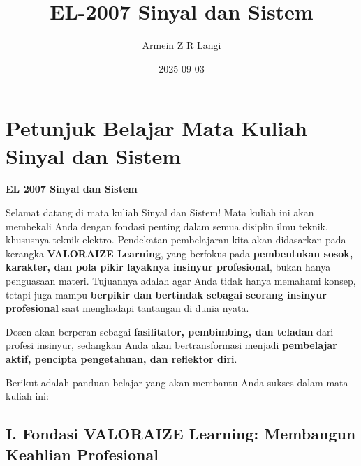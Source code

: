 \documentclass[
  letterpaper,
  DIV=11,
  numbers=noendperiod]{scrreprt}
\title{EL-2007 Sinyal dan Sistem}
\author{Armein Z R Langi}
\date{2025-09-03}
\renewcommand*\contentsname{Table of contents}
\newcommand\contentsname{Table of contents}
\begin{document}
\maketitle

\renewcommand*\contentsname{Table of contents}
{
\hypersetup{linkcolor=}
\setcounter{tocdepth}{2}
\tableofcontents
}


\chapter*{Petunjuk Belajar Mata Kuliah Sinyal dan
Sistem}\label{petunjuk-belajar-mata-kuliah-sinyal-dan-sistem}


\textbf{EL 2007 Sinyal dan Sistem}

Selamat datang di mata kuliah Sinyal dan Sistem! Mata kuliah ini akan
membekali Anda dengan fondasi penting dalam semua disiplin ilmu teknik,
khususnya teknik elektro. Pendekatan pembelajaran kita akan didasarkan
pada kerangka \textbf{VALORAIZE Learning}, yang berfokus pada
\textbf{pembentukan sosok, karakter, dan pola pikir layaknya insinyur
profesional}, bukan hanya penguasaan materi. Tujuannya adalah agar Anda
tidak hanya memahami konsep, tetapi juga mampu \textbf{berpikir dan
bertindak sebagai seorang insinyur profesional} saat menghadapi
tantangan di dunia nyata.

Dosen akan berperan sebagai \textbf{fasilitator, pembimbing, dan
teladan} dari profesi insinyur, sedangkan Anda akan bertransformasi
menjadi \textbf{pembelajar aktif, pencipta pengetahuan, dan reflektor
diri}.

Berikut adalah panduan belajar yang akan membantu Anda sukses dalam mata
kuliah ini:

\section*{\texorpdfstring{\textbf{I. Fondasi VALORAIZE Learning:
Membangun Keahlian
Profesional}}{I. Fondasi VALORAIZE Learning: Membangun Keahlian Profesional}}\label{i.-fondasi-valoraize-learning-membangun-keahlian-profesional}

\end{document}
